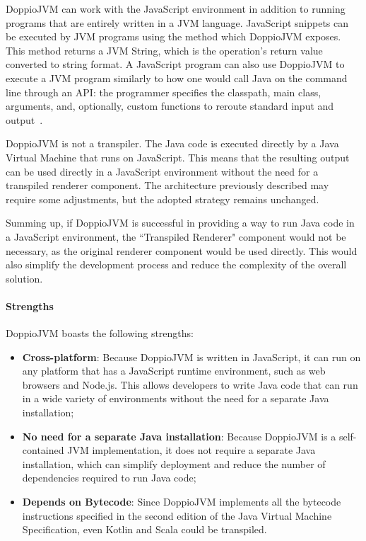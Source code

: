 DoppioJVM can work with the JavaScript environment in addition to running programs that are entirely written in a JVM language. JavaScript snippets can be executed by JVM programs using the  method which DoppioJVM exposes. This method returns a JVM String, which is the operation's return value converted to string format. A JavaScript program can also use DoppioJVM to execute a JVM program similarly to how one would call Java on the command line through an API: the programmer specifies the classpath, main class, arguments, and, optionally, custom functions to reroute standard input and output~\cite{doppio}.\newline

DoppioJVM is not a transpiler. The Java code is executed directly by a Java Virtual Machine that runs on JavaScript. This means that the resulting output can be used directly in a JavaScript environment without the need for a transpiled renderer component. The architecture previously described may require some adjustments, but the adopted strategy remains unchanged.\newline

Summing up, if DoppioJVM is successful in providing a way to run Java code in a JavaScript environment, the ``Transpiled Renderer" component would not be necessary, as the original renderer component would be used directly. This would also simplify the development process and reduce the complexity of the overall solution.

\paragraph{Strengths} DoppioJVM boasts the following strengths:
\begin{itemize}
	\item \textbf{Cross-platform}: Because DoppioJVM is written in JavaScript, it can run on any platform that has a JavaScript runtime environment, such as web browsers and Node.js. This allows developers to write Java code that can run in a wide variety of environments without the need for a separate Java installation;
	\item \textbf{No need for a separate Java installation}: Because DoppioJVM is a self-contained JVM implementation, it does not require a separate Java installation, which can simplify deployment and reduce the number of dependencies required to run Java code;
	\item \textbf{Depends on Bytecode}: Since DoppioJVM implements all the bytecode instructions specified in the second edition of the Java Virtual Machine Specification, even Kotlin and Scala could be transpiled.
\end{itemize}
